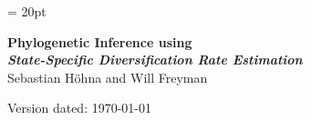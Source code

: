 \documentclass[11pt]{article}
\begin{document}
\renewcommand{\headrulewidth}{0.5pt}
\headsep = 20pt
\lhead{ }

\thispagestyle{plain}
\begin{center}

\textbf{\LARGE Phylogenetic Inference using \RevBayes}\\\vspace{2mm}
\textbf{\it{\Large State-Specific Diversification Rate Estimation}}\\\vspace{2mm}
\vspace{1cm}
{\Large Sebastian H{\"o}hna and Will Freyman}
\vspace{1cm}
\end{center}

\def \ResourcePath {./}
\def \GlobalResourcePath {../}



Version dated: \today
\end{document}
